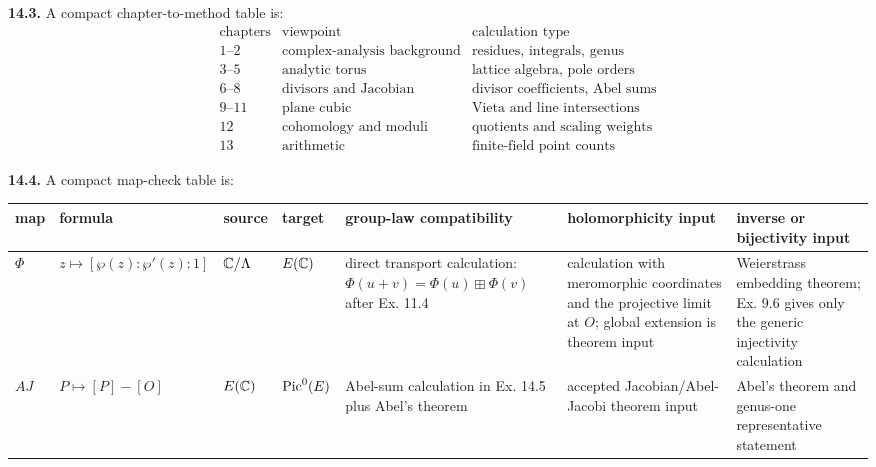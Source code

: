 \textbf{14.3.} A compact chapter-to-method table is:
\[
\begin{array}{c|c|c}
\text{chapters} & \text{viewpoint} & \text{calculation type}\\ \hline
1\text{--}2 & \text{complex-analysis background} & \text{residues, integrals, genus}\\
3\text{--}5 & \text{analytic torus} & \text{lattice algebra, pole orders}\\
6\text{--}8 & \text{divisors and Jacobian} & \text{divisor coefficients, Abel sums}\\
9\text{--}11 & \text{plane cubic} & \text{Vieta and line intersections}\\
12 & \text{cohomology and moduli} & \text{quotients and scaling weights}\\
13 & \text{arithmetic} & \text{finite-field point counts}
\end{array}
\]

\begin{center}
\end{center}

\textbf{14.4.} A compact map-check table is:

\begin{center}
\scriptsize
\setlength{\tabcolsep}{2pt}
\begin{tabular}{|L{1.15cm}|L{2.05cm}|L{1.35cm}|L{1.35cm}|L{2.35cm}|L{2.25cm}|L{2.45cm}|}
\hline
map & formula & source & target & group-law compatibility &
holomorphicity input & inverse or bijectivity input\\
\hline
\(\Phi\) &
\(z\mapsto[\wp(z):\wp'(z):1]\) &
\(\mathbb{C}/\Lambda\) &
\(E(\mathbb{C})\) &
direct transport calculation:
\(\Phi(u+v)=\Phi(u)\boxplus\Phi(v)\) after Ex. 11.4 &
calculation with meromorphic coordinates and the projective limit at \(O\);
global extension is theorem input &
Weierstrass embedding theorem; Ex. 9.6 gives only the generic injectivity
calculation\\
\hline
\(AJ\) &
\(P\mapsto[P]-[O]\) &
\(E(\mathbb{C})\) &
\(\operatorname{Pic}^0(E)\) &
Abel-sum calculation in Ex. 14.5 plus Abel's theorem &
accepted Jacobian/Abel-Jacobi theorem input &
Abel's theorem and genus-one representative statement\\
\hline
\end{tabular}
\end{center}


